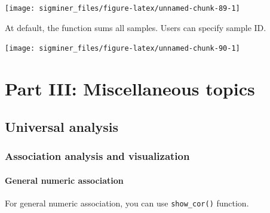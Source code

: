 \documentclass[
  12pt,
  a4paper,
  twoside]{book}
\newenvironment{Shaded}{\begin{snugshade}}{\end{snugshade}}
\newcommand{\AttributeTok}[1]{\textcolor[rgb]{0.77,0.63,0.00}{#1}}
\newcommand{\DecValTok}[1]{\textcolor[rgb]{0.00,0.00,0.81}{#1}}
\newcommand{\FunctionTok}[1]{\textcolor[rgb]{0.00,0.00,0.00}{#1}}
\newcommand{\NormalTok}[1]{#1}
\newcommand{\SpecialCharTok}[1]{\textcolor[rgb]{0.00,0.00,0.00}{#1}}
\newcommand{\StringTok}[1]{\textcolor[rgb]{0.31,0.60,0.02}{#1}}
\begin{document}
\texttt{[image: sigminer\_files/figure-latex/unnamed-chunk-89-1]}

At default, the function sums all samples. Users can specify sample ID.

\begin{Shaded}
\end{Shaded}

\texttt{[image: sigminer\_files/figure-latex/unnamed-chunk-90-1]}

\hypertarget{part-part-iii-miscellaneous-topics}{%
\part*{Part III: Miscellaneous topics}\label{part-part-iii-miscellaneous-topics}}

\hypertarget{universal-analysis}{%
\chapter{Universal analysis}\label{universal-analysis}}

\hypertarget{association-analysis-and-visualization}{%
\section{Association analysis and visualization}\label{association-analysis-and-visualization}}

\hypertarget{general-numeric-association}{%
\subsection{General numeric association}\label{general-numeric-association}}

For general numeric association, you can use \texttt{show\_cor()} function.
\end{document}
